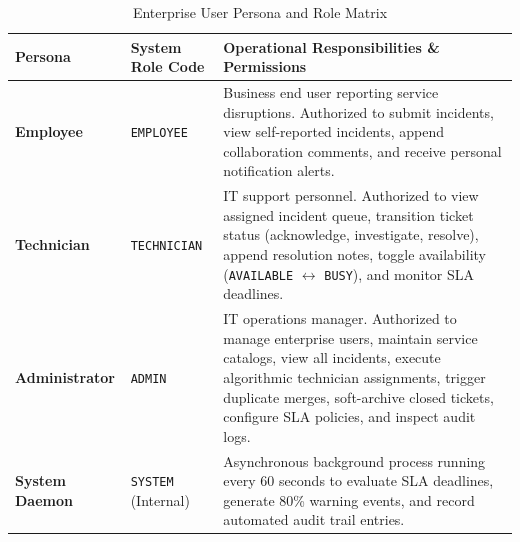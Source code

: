 \documentclass[11pt,a4paper,oneside]{report}
\begin{document}
\begin{table}[H]
\centering
\small
\caption{Enterprise User Persona and Role Matrix}
\label{tab:user_roles}
\begin{tabular}{p{2.5cm}p{3.5cm}p{8.5cm}}
\toprule
\textbf{Persona} & \textbf{System Role Code} & \textbf{Operational Responsibilities \& Permissions} \\
\midrule
\textbf{Employee} & \texttt{EMPLOYEE} & Business end user reporting service disruptions. Authorized to submit incidents, view self-reported incidents, append collaboration comments, and receive personal notification alerts. \\
\addlinespace
\textbf{Technician} & \texttt{TECHNICIAN} & IT support personnel. Authorized to view assigned incident queue, transition ticket status (acknowledge, investigate, resolve), append resolution notes, toggle availability (\texttt{AVAILABLE} $\leftrightarrow$ \texttt{BUSY}), and monitor SLA deadlines. \\
\addlinespace
\textbf{Administrator} & \texttt{ADMIN} & IT operations manager. Authorized to manage enterprise users, maintain service catalogs, view all incidents, execute algorithmic technician assignments, trigger duplicate merges, soft-archive closed tickets, configure SLA policies, and inspect audit logs. \\
\addlinespace
\textbf{System Daemon} & \texttt{SYSTEM} (Internal) & Asynchronous background process running every 60 seconds to evaluate SLA deadlines, generate 80\% warning events, and record automated audit trail entries. \\
\bottomrule
\end{tabular}
\end{table}
\end{document}

